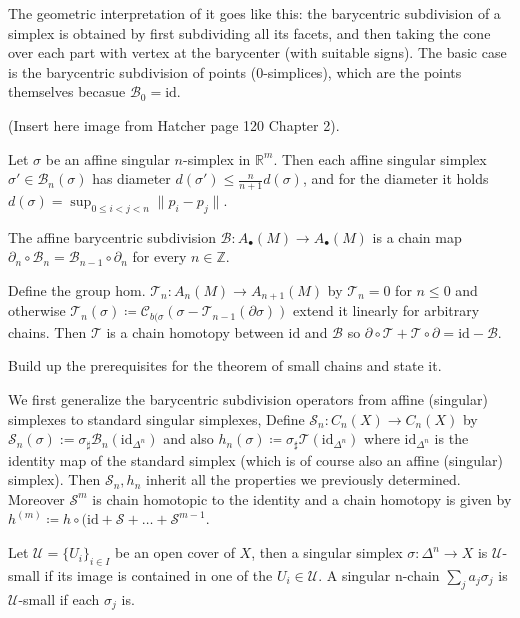 The geometric interpretation of it goes like this: the barycentric subdivision of a
simplex is obtained by first subdividing all its facets, and then taking the cone over each part
with vertex at the barycenter (with suitable signs). The basic case is the barycentric subdivision
of points (0-simplices), which are the points themselves becasue \( \mathcal{B}_0 = \text{id} \).

(Insert here image from Hatcher page 120 Chapter 2).

Let \( \sigma \) be an affine singular \( n \)-simplex in \( \mathbb{R}^m \). Then each affine singular simplex
\( \sigma' \in \mathcal{B}_n(\sigma) \) has diameter \( d(\sigma') \leq \frac{n}{n+1}d(\sigma) \),
and for the diameter it holds \( d(\sigma) = \sup_{0 \leq i < j < n} \|p_i - p_j\| \).

The affine barycentric subdivision \( \mathcal{B} : A_\bullet(M) \to A_\bullet(M) \) is a chain map
\( \partial_n \circ \mathcal{B}_n = \mathcal{B}_{n-1} \circ \partial_n \) for every \( n \in \mathbb{Z} \).

Define the group hom. \( \mathcal{T}_n : A_n(M) \to A_{n+1}(M) \) by 
\( \mathcal{T}_n = 0 \) for \( n \leq 0 \)
and otherwise \( \mathcal{T}_{n}(\sigma) \coloneqq \mathcal{C}_{b(\sigma}(\sigma -  \mathcal{T}_{n-1}(\partial \sigma)) \) extend it linearly for arbitrary chains.
Then \( \mathcal{T} \) is a chain homotopy between \( \text{id} \) and \( \mathcal{B} \) so \( \partial \circ \mathcal{T} + \mathcal{T} \circ \partial = \text{id} - \mathcal{B} \).

Build up the prerequisites for the theorem of small chains and state it.

We first generalize the barycentric subdivision operators from affine (singular) simplexes to standard singular simplexes,
Define \( \mathcal{S}_n : C_n(X) \to C_n(X) \) by \( \mathcal{S}_n(\sigma) := \sigma_{\sharp}\mathcal{B}_n(\text{id}_{\Delta^n})\)
and also \( h_n(\sigma) \coloneqq \sigma_{\sharp}\mathcal{T}(\text{id}_{\Delta^n}) \) where \( \text{id}_{\Delta^n} \)
is the identity map of the standard simplex (which is of course also an affine (singular) simplex).
Then \( \mathcal{S}_n, h_n \) inherit all the properties we previously determined.
Moreover \( \mathcal{S}^m \) is chain homotopic to the identity and a chain homotopy is given by
\( h^{(m)} \coloneqq h \circ (\text{id} + \mathcal{S} + \dots + \mathcal{S}^{m-1} \).

Let \( \mathcal{U} = \{U_i\}_{i \in I} \) be an open cover of \( X \), then a singular simplex \( \sigma : \Delta^n \to X \)
is \( \mathcal{U} \)-small if its image is contained in one of the \( U_i \in \mathcal{U} \).
A singular n-chain \( \sum_j a_j \sigma_j \) is \( \mathcal{U} \)-small if each \( \sigma_j \) is.

